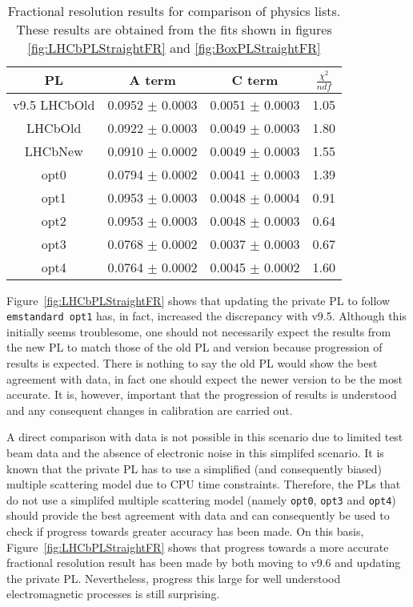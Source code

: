 \begin{table}[h]
  \centering
  \begin{tabular}{|c|c|c|c|}
      \hline
      PL & A term & C term & $\frac{\chi^2}{ndf}$  \\ \hline
      v9.5 LHCbOld & 0.0952 $\pm$ 0.0003 & 0.0051 $\pm$ 0.0003 & 1.05 \\ \hline
      LHCbOld & 0.0922 $\pm$ 0.0003 & 0.0049 $\pm$ 0.0003 & 1.80 \\ \hline 
      LHCbNew & 0.0910 $\pm$ 0.0002 & 0.0049 $\pm$ 0.0003 & 1.55 \\ \hline
      opt0 & 0.0794 $\pm$ 0.0002 & 0.0041 $\pm$ 0.0003 & 1.39 \\ \hline
      opt1 & 0.0953 $\pm$ 0.0003 & 0.0048 $\pm$ 0.0004 & 0.91 \\ \hline
      opt2 & 0.0953 $\pm$ 0.0003 & 0.0048 $\pm$ 0.0003 & 0.64 \\ \hline 
      opt3 & 0.0768 $\pm$ 0.0002 & 0.0037 $\pm$ 0.0003 & 0.67 \\ \hline 
      opt4 & 0.0764 $\pm$ 0.0002 & 0.0045 $\pm$ 0.0002 & 1.60 \\ \hline
  \end{tabular}
  \caption{Fractional resolution results for comparison of \geant physics lists.  These results are obtained from the fits shown in figures \ref{fig:LHCbPLStraightFR} and \ref{fig:BoxPLStraightFR}}
  \label{tab:AllPL}
\end{table}

Figure~\ref{fig:LHCbPLStraightFR} shows that updating the \lhcb private PL to follow \texttt{emstandard opt1} has, in fact, increased the discrepancy with v9.5.  Although this initially seems troublesome, one should not necessarily expect the results from the new PL to match those of the old PL and \geant version because progression of results is expected.  There is nothing to say the old PL would show the best agreement with data, in fact one should expect the newer version to be the most accurate.  It is, however, important that the progression of results is understood and any consequent changes in calibration are carried out.

A direct comparison with data is not possible in this scenario due to limited test beam data and the absence of electronic noise in this simplifed scenario.   It is known that the \lhcb private PL has to use a simplified (and consequently biased) multiple scattering model due to CPU time constraints.  Therefore, the PLs that do not use a simplifed multiple scattering model (namely \texttt{opt0}, \texttt{opt3} and \texttt{opt4}) should provide the best agreement with data and can consequently be used to check if progress towards greater accuracy has been made.  On this basis, Figure~\ref{fig:LHCbPLStraightFR} shows that progress towards a more accurate fractional resolution result has been made by both moving to \geant v9.6 and updating the \lhcb private PL. Nevertheless, progress this large for well understood electromagnetic processes is still surprising.

